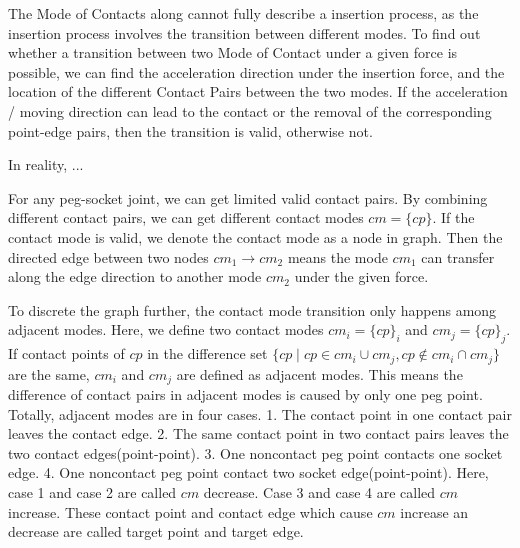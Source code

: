 The Mode of Contacts along cannot fully describe a insertion process, as the insertion process involves the transition between different modes. To find out whether a transition between two Mode of Contact under a given force is possible, we can find the acceleration direction under the insertion force, and the location of the different Contact Pairs between the two modes. If the acceleration / moving direction can lead to the contact or the removal of the corresponding point-edge pairs, then the transition is valid, otherwise not. 




In reality, ...







For any peg-socket joint, we can get limited valid contact pairs. By combining different contact pairs, we can get different contact modes ${cm}=\{{cp}\}$. If the contact mode is valid, we denote the contact mode as a node in graph. Then the directed edge between two nodes ${cm}_1\to{cm}_2$ means the mode ${cm}_1$ can transfer along the edge direction to another mode ${cm}_2$ under the given force. 

To discrete the graph further, the contact mode transition only happens among adjacent modes. Here, we define two contact modes ${cm_i}=\{{cp}\}_i$ and ${cm_j}=\{{cp}\}_j$. If contact points of ${cp}$ in the difference set $\{{cp}\mid {cp}\in{cm_i}\cup{cm_j}, {cp}\notin{cm_i}\cap{cm_j}\}$ are the same, ${cm_i}$ and ${cm_j}$ are defined as adjacent modes. This means the difference of contact pairs in adjacent modes is caused by only one peg point. Totally, adjacent modes are in four cases. 
1. The contact point in one contact pair leaves the contact edge.
2. The same contact point in two contact pairs leaves the two contact edges(point-point).
3. One noncontact peg point contacts one socket edge.
4. One noncontact peg point contact two socket edge(point-point).
Here, case 1 and case 2 are called ${cm}$ decrease. Case 3 and case 4 are called ${cm}$ increase.
These contact point and contact edge which cause ${cm}$ increase an decrease are called target point and target edge. 

